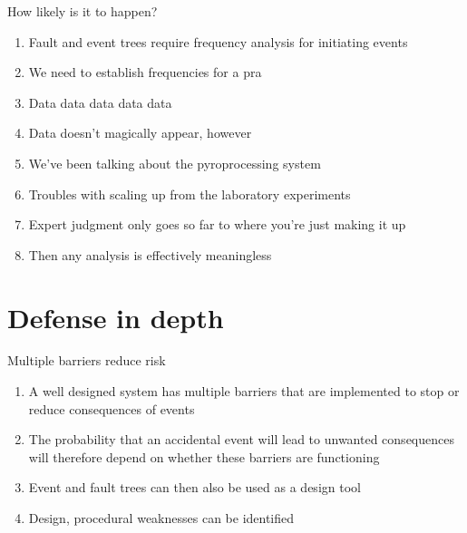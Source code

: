 \documentclass[aspectratio=1610,pdftex,dvipsnames,compress,xcolor={dvipsnames}]{beamer}
\newcommand{\acs}{\acrshort} %
\begin{document}
\begin{frame}{How likely is it to happen?}
    \begin{enumerate}[series=outerlist,topsep=0pt,itemsep=11pt,leftmargin=*,label=(\arabic*)]
        \item[]Fault and event trees require frequency analysis for initiating events
        \item[]We need to establish frequencies for a \acs{pra}
        \item[]Data data data data data
        \item[]Data doesn't magically appear, however
        \item[]We've been talking about the pyroprocessing system
        \item[]Troubles with scaling up from the laboratory experiments
        \item[]Expert judgment only goes so far to where you're just making it up
        \item[]Then any analysis is effectively meaningless
    \end{enumerate}
\end{frame}


\section{Defense in depth}


\addtocounter{framenumber}{-1}
\begin{frame}{Multiple barriers reduce risk}
    \begin{enumerate}[series=outerlist,topsep=0pt,itemsep=21pt,leftmargin=*,label=(\arabic*)]
        \item[]A well designed system has multiple barriers that are implemented to stop or reduce consequences of events
        \item[]The probability that an accidental event will lead to unwanted consequences will therefore depend on whether these barriers are functioning
        \item[]Event and fault trees can then also be used as a design tool
        \item[]Design, procedural weaknesses can be identified
    \end{enumerate}
\end{frame}
\end{document}
